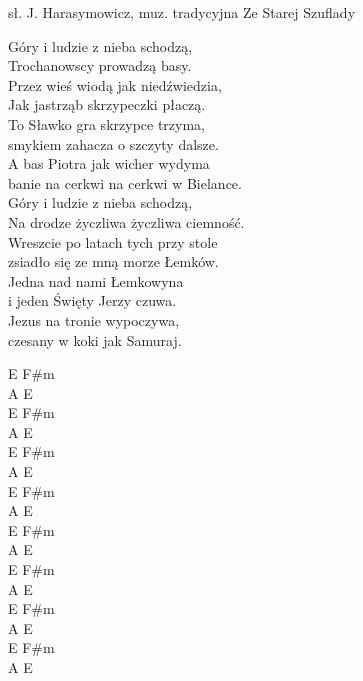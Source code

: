 {sł. J. Harasymowicz, muz. tradycyjna}
{Ze Starej Szuflady}
\begin{text}
Góry i ludzie z nieba schodzą,\\
Trochanowscy prowadzą basy.\\
Przez wieś wiodą jak niedźwiedzia,\\
Jak jastrząb skrzypeczki płaczą.\\

To Sławko gra skrzypce trzyma,\\
smykiem zahacza o szczyty dalsze.\\
A bas Piotra jak wicher wydyma\\
banie na cerkwi na cerkwi w Bielance.\\

Góry i ludzie z nieba schodzą,\\
Na drodze życzliwa życzliwa ciemność.\\
Wreszcie po latach tych przy stole\\
zsiadło się ze mną morze Łemków.\\

Jedna nad nami Łemkowyna\\
i jeden Święty Jerzy czuwa.\\
Jezus na tronie wypoczywa,\\
czesany w koki jak Samuraj.\\
\end{text}
\begin{chord}
E F#m\\
A E\\
E F#m\\
A E\\

E F#m\\
A E\\
E F#m\\
A E\\

E F#m\\
A E\\
E F#m\\
A E\\

E F#m\\
A E\\
E F#m\\
A E\\
\end{chord}
